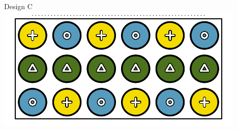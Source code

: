 {\begin{center}
\begin{minipage}[c]{0.3\textwidth}
\begin{center}
\end{center}
\end{minipage}
\begin{minipage}[c]{0.3\textwidth}
\begin{center}
Design C \\
\includegraphics[width = \textwidth]{ch_data_collection/figures/eoce/alfalfa/alfalfaC}
\end{center}
\end{minipage}
\end{center}
}{}


